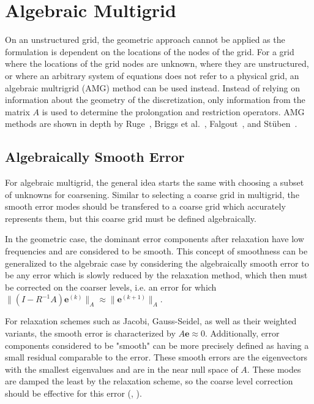 


\section{Algebraic Multigrid}


On an unstructured grid, the geometric approach cannot be applied as the formulation is dependent on the locations of the nodes of the grid. For a grid where the locations of the grid nodes are unknown, where they are unstructured, or where an arbitrary system of equations does not refer to a physical grid, an algebraic multrigrid (AMG) method can be used instead. Instead of relying on information about the geometry of the discretization, only information from the matrix $A$ is used to determine the prolongation and restriction operators. AMG methods are shown in depth by Ruge~\cite{Ruge1987}, Briggs et al.~\cite{Briggs2000}, Falgout~\cite{Falgout2006}, and Stüben~\cite{Stuben1999}.

\subsection{Algebraically Smooth Error}

For algebraic multigrid, the general idea starts the same with choosing a subset of unknowns for coarsening. Similar to selecting a coarse grid in multigrid, the smooth error modes should be transfered to a coarse grid which accurately represents them, but this coarse grid must be defined algebraically.

In the geometric case, the dominant error components after relaxation have low frequencies and are considered to be smooth. This concept of smoothness can be generalized to the algebraic case by considering the algebraically smooth error to be any error which is slowly reduced by the relaxation method, which then must be corrected on the coarser levels, i.e. an error for which $ \|(I - R^{-1}A)\mathbf{e}^{(k)}\|_A \approx \| \mathbf{e}^{(k+1)}\|_A $.

For relaxation schemes such as Jacobi, Gauss-Seidel, as well as their weighted variants, the smooth error is characterized by $ A\mathbf{e} \approx 0 $. Additionally, error components considered to be "smooth" can be more precisely defined as having a small residual comparable to the error. These smooth errors are the eigenvectors with the smallest eigenvalues and are in the near null space of $A$. These modes are damped the least by the relaxation scheme, so the coarse level correction should be effective for this error (\cite{Falgout2006}, \cite{Ruge1987}).

